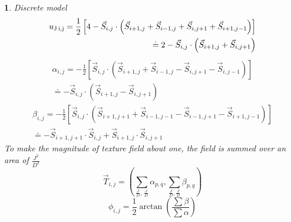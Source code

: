 \documentclass[12pt]{article}
\theoremstyle{problemstyle}
\newtheorem{problem}{}
\begin{document}
\begin{problem}
    Discrete model
    \begin{equation}\begin{split}
        u_{\rm{J}\,{i,j}} = \frac{1}{2} \left[ 4 - \vec{S}_{i,j}\cdot{ \left( {\vec{S}_{i+1,j}+\vec{S}_{i-1,j}+\vec{S}_{i,j+1}+\vec{S}_{i+1,j-1}}\right) }
        \right]\\
        \doteq 2 - \vec{S}_{i,j}\cdot{ \left( {\vec{S}_{i+1,j}+\vec{S}_{i,j+1}}\right) }
    \end{split}\end{equation}
    \begin{equation}\begin{split}
        \alpha_{i,j} = - \frac{1}{2} \left[ \vec{S}_{i,j}\cdot{\left({\vec{S}_{i+1,j}+\vec{S}_{i-1,j}-\vec{S}_{i,j+1}-\vec{S}_{i,j-1}}\right) }\right]
        \\ \doteq - \vec{S}_{i,j}\cdot{\left({\vec{S}_{i+1,j}-\vec{S}_{i,j+1}}\right)}
    \end{split}\end{equation}
    \begin{equation}\begin{split}
        \beta_{i,j} = - \frac{1}{2} \left[ \vec{S}_{i,j}\cdot{\left({\vec{S}_{i+1,j+1}+\vec{S}_{i-1,j-1}-\vec{S}_{i-1,j+1}-\vec{S}_{i+1,j-1}}\right) }\right]
        \\ \doteq  -{\vec{S}_{i+1,j+1}}\cdot\vec{S}_{i,j}+\vec{S}_{i+1,j}\cdot\vec{S}_{i,j+1}
    \end{split}\end{equation}
    To make the magnitude of texture field about one, the field is summed over an area of $\frac{J^2}{D^2}$
    \begin{equation}
        \vec{T}_{i,j} = \left({\sum_{\frac{J}{D},\,\frac{J}{D}}{\alpha_{p,q}},\sum_{\frac{J}{D},\frac{J}{D}}{\beta_{p,q}}}\right)
    \end{equation}
    \begin{equation}
        \phi_{i,j} = \frac{1}{2} \arctan \left( \frac{\sum{\beta}}{\sum{\alpha}} \right)
    \end{equation}
\end{problem}
\end{document}
